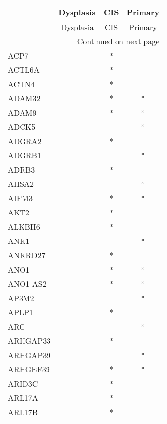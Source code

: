 \begin{longtable}{lccc}
\toprule
{} & Dysplasia & CIS & Primary \\
\midrule
\endfirsthead

\toprule
{} & Dysplasia & CIS & Primary \\
\midrule
\endhead
\midrule
\multicolumn{4}{r}{{Continued on next page}} \\
\midrule
\endfoot

\bottomrule
\endlastfoot
ACP7         &           &   * &         \\
ACTL6A       &           &   * &         \\
ACTN4        &           &   * &         \\
ADAM32       &           &   * &       * \\
ADAM9        &           &   * &       * \\
ADCK5        &           &     &       * \\
ADGRA2       &           &   * &         \\
ADGRB1       &           &     &       * \\
ADRB3        &           &   * &         \\
AHSA2        &           &     &       * \\
AIFM3        &           &   * &       * \\
AKT2         &           &   * &         \\
ALKBH6       &           &   * &         \\
ANK1         &           &     &       * \\
ANKRD27      &           &   * &         \\
ANO1         &           &   * &       * \\
ANO1-AS2     &           &   * &       * \\
AP3M2        &           &     &       * \\
APLP1        &           &   * &         \\
ARC          &           &     &       * \\
ARHGAP33     &           &   * &         \\
ARHGAP39     &           &     &       * \\
ARHGEF39     &           &   * &       * \\
ARID3C       &           &   * &         \\
ARL17A       &           &   * &         \\
ARL17B       &           &   * &         \\

\end{longtable}
